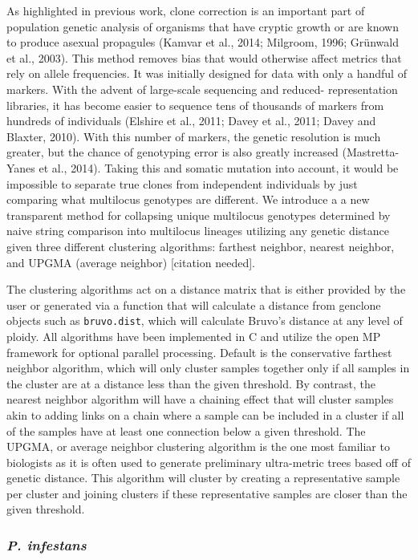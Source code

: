 \documentclass{frontiersSCNS} %
\begin{document}
As highlighted in previous work, clone correction is an important part
of population genetic analysis of organisms that have cryptic growth or
are known to produce asexual propagules (Kamvar et al., 2014; Milgroom,
1996; Grünwald et al., 2003). This method removes bias that would
otherwise affect metrics that rely on allele frequencies. It was
initially designed for data with only a handful of markers. With the
advent of large-scale sequencing and reduced- representation libraries,
it has become easier to sequence tens of thousands of markers from
hundreds of individuals (Elshire et al., 2011; Davey et al., 2011; Davey
and Blaxter, 2010). With this number of markers, the genetic resolution
is much greater, but the chance of genotyping error is also greatly
increased (Mastretta-Yanes et al., 2014). Taking this and somatic
mutation into account, it would be impossible to separate true clones
from independent individuals by just comparing what multilocus genotypes
are different. We introduce a a new transparent method for collapsing
unique multilocus genotypes determined by naive string comparison into
multilocus lineages utilizing any genetic distance given three different
clustering algorithms: farthest neighbor, nearest neighbor, and UPGMA
(average neighbor) {[}citation needed{]}.

The clustering algorithms act on a distance matrix that is either
provided by the user or generated via a function that will calculate a
distance from genclone objects such as \texttt{bruvo.dist}, which will
calculate Bruvo's distance at any level of ploidy. All algorithms have
been implemented in C and utilize the open MP framework for optional
parallel processing. Default is the conservative farthest neighbor
algorithm, which will only cluster samples together only if all samples
in the cluster are at a distance less than the given threshold. By
contrast, the nearest neighbor algorithm will have a chaining effect
that will cluster samples akin to adding links on a chain where a sample
can be included in a cluster if all of the samples have at least one
connection below a given threshold. The UPGMA, or average neighbor
clustering algorithm is the one most familiar to biologists as it is
often used to generate preliminary ultra-metric trees based off of
genetic distance. This algorithm will cluster by creating a
representative sample per cluster and joining clusters if these
representative samples are closer than the given threshold.

\subsubsection*{\texorpdfstring{\emph{P.
infestans}}{P. infestans}}\label{p.-infestans}
\end{document}
